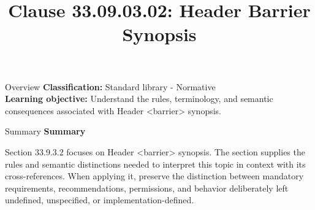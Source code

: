 \documentclass[10pt,letterpaper]{article}
\title{Clause 33.09.03.02: Header Barrier Synopsis}
\author{}
\date{}
\begin{document}
\maketitle
\begin{CornellOverviewBox}{Overview}
\textbf{Classification:} Standard library - Normative\\[2pt]
\textbf{Learning objective:} Understand the rules, terminology, and semantic consequences associated with Header <barrier> synopsis.
\end{CornellOverviewBox}\begin{CornellSummaryBox}{Summary}
{\sffamily\bfseries\color{Accent} Summary}\par\vspace{3pt}Section 33.9.3.2 focuses on Header <barrier> synopsis. The section supplies the rules and semantic distinctions needed to interpret this topic in context with its cross-references. When applying it, preserve the distinction between mandatory requirements, recommendations, permissions, and behavior deliberately left undefined, unspecified, or implementation-defined.
\end{CornellSummaryBox}
\end{document}

